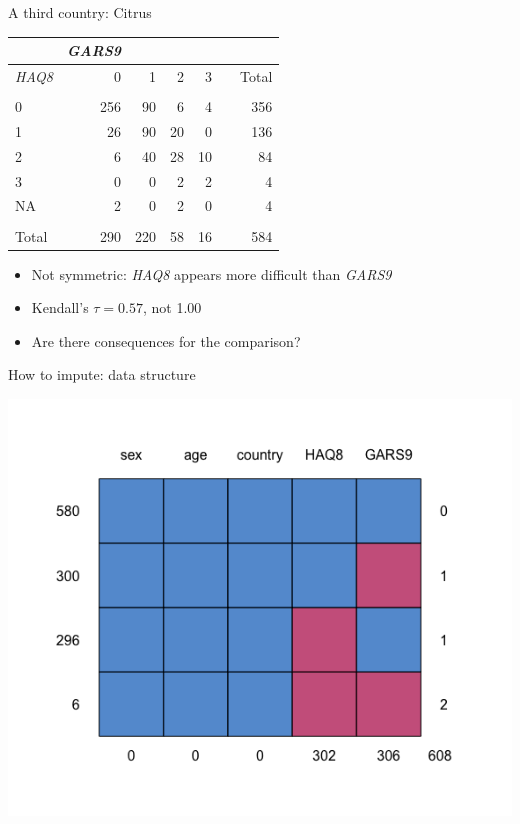 \documentclass[ignorenonframetext,aspectratio=43]{beamer}
\providecommand{\tightlist}{%
  \setlength{\itemsep}{0pt}\setlength{\parskip}{0pt}}
\begin{document}
\begin{frame}{A third country: Citrus}
\protect\hypertarget{a-third-country-citrus}{}

\begin{longtable}[]{@{}lrrrrlr@{}}
\toprule
& \emph{GARS9 } & & & & &\tabularnewline
\midrule
\endhead
\emph{HAQ8} & 0 & 1 & 2 & 3 & & Total\tabularnewline
& & & & & &\tabularnewline
0 & 256 & 90 & 6 & 4 & & 356\tabularnewline
1 & 26 & 90 & 20 & 0 & & 136\tabularnewline
2 & 6 & 40 & 28 & 10 & & 84\tabularnewline
3 & 0 & 0 & 2 & 2 & & 4\tabularnewline
NA & 2 & 0 & 2 & 0 & & 4\tabularnewline
& & & & & &\tabularnewline
Total & 290 & 220 & 58 & 16 & & 584\tabularnewline
\bottomrule
\end{longtable}

\begin{itemize}
\tightlist
\item
  Not symmetric: \emph{HAQ8} appears more difficult than \emph{GARS9}
\item
  Kendall's \(\tau = 0.57\), not 1.00
\item
  Are there consequences for the comparison?
\end{itemize}

\end{frame}

\begin{frame}{How to impute: data structure}
\protect\hypertarget{how-to-impute-data-structure}{}

\includegraphics{figures/mdpattern.png}

\end{frame}
\end{document}
